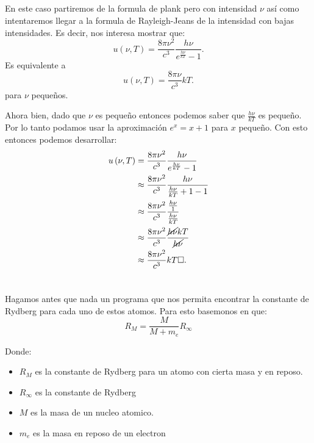 \documentclass{report}
\begin{document}
\section{}

\section{}

En este caso partiremos de la formula de plank pero con intensidad $\nu$ así como intentaremos llegar a la formula de Rayleigh-Jeans de la intensidad con bajas intensidades. Es decir, nos interesa mostrar que: \[
u\left( \nu, T \right) = \frac{8\pi \nu^2}{c^3} \frac{h\nu}{e^{\frac{h\nu}{kT}} - 1}
.\] Es equivalente a \[
u\left( \nu, T \right) = \frac{8\pi \nu}{c^{3}}kT
.\] para $\nu$ pequeños.

Ahora bien, dado que $\nu$ es pequeño entonces podemos saber que $\frac{h\nu}{kT}$ es pequeño. Por lo tanto podamos usar la aproximación $e^{x} = x + 1$ para $x$ pequeño. Con esto entonces podemos desarrollar:
\begin{align*}
  u\left( \nu,T \right) &= \frac{8\pi \nu^2}{c^{3}} \frac{h\nu}{e^{\frac{h\nu}{kT}}- 1} \\
			&\approx \frac{8\pi \nu^2}{c^3} \frac{h\nu}{\frac{h\nu}{kT} + 1 - 1}\\
			&\approx \frac{8\pi \nu^2}{c^{3}}\frac{\frac{h\nu}{1}}{\frac{h\nu}{kT}}\\
			&\approx \frac{8\pi \nu^2}{c^{3}}\frac{\cancel{h\nu} kT}{\cancel{h\nu}}\\
			&\approx \frac{8\pi \nu^2}{c^{3}}kT \square
.\end{align*}

\chapter{}

\chapter{}

\chapter{}

Hagamos antes que nada un programa que nos permita encontrar la constante de Rydberg para cada uno de estos atomos. Para esto basemonos en que: \[
  R_M = \frac{M}{M + m_e} R_\infty\]

Donde:
\begin{itemize}
  \item $R_M$ es la constante de Rydberg para un atomo con cierta masa y en reposo.
  \item $R_\infty$ es la constante de Rydberg
  \item $M$ es la masa de un nucleo atomico.
  \item $m_e$ es la masa en reposo de un electron
\end{itemize}
\end{document}
